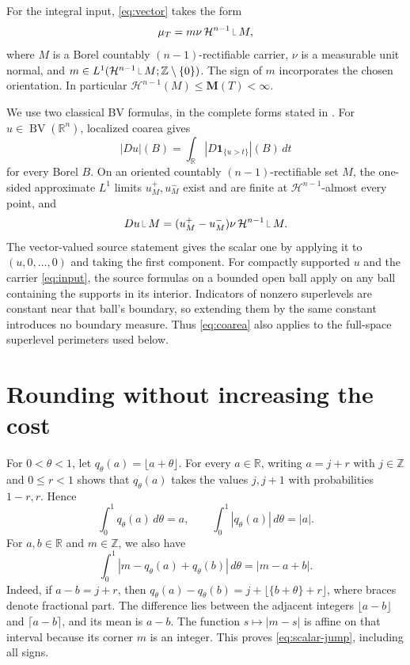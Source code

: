 \documentclass[11pt]{article}
\newcommand{\R}{\mathbb R}
\newcommand{\Z}{\mathbb Z}
\newcommand{\M}{\mathbf M}
\newcommand{\HH}{\mathcal H}
\newcommand{\restr}{\mathbin{\vrule height 1.4ex depth 0pt width .07ex\vrule height .07ex depth 0pt width .65ex}}
\newcommand{\BV}{\operatorname{BV}}
\begin{document}
For the integral input, \eqref{eq:vector} takes the form
\begin{equation}\label{eq:input}
\mu_T=m\nu\,\HH^{n-1}\restr M,
\end{equation}
where $M$ is a Borel countably $(n-1)$-rectifiable carrier, $\nu$ is a
measurable unit normal, and $m\in L^1(\HH^{n-1}\restr M;\Z\setminus\{0\})$.
The sign of $m$ incorporates the chosen orientation.
In particular $\HH^{n-1}(M)\le\M(T)<\infty$.

We use two classical BV formulas, in the complete forms stated in
\cite[Theorems A.9 and A.18]{RT}. For $u\in\BV(\R^n)$, localized coarea gives
\begin{equation}\label{eq:coarea}
|Du|(B)=\int_\R |D\mathbf1_{\{u>t\}}|(B)\,dt
\end{equation}
for every Borel $B$. On an oriented countably $(n-1)$-rectifiable set $M$,
the one-sided approximate $L^1$ limits $u_M^+,u_M^-$ exist and are finite
at $\HH^{n-1}$-almost every point, and
\begin{equation}\label{eq:trace}
Du\restr M=(u_M^+-u_M^-)\nu\,\HH^{n-1}\restr M.
\end{equation}
The vector-valued source statement gives the scalar one by applying it to
$(u,0,\ldots,0)$ and taking the first component. For compactly supported $u$
and the carrier \eqref{eq:input}, the source formulas on a bounded open ball
apply on any ball containing the supports in its interior. Indicators of
nonzero superlevels are constant near that ball's boundary, so extending
them by the same constant introduces no boundary measure. Thus
\eqref{eq:coarea} also applies to the full-space superlevel perimeters used
below.

\section{Rounding without increasing the cost}
For $0<\theta<1$, let $q_\theta(a)=\lfloor a+\theta\rfloor$.
For every $a\in\R$, writing $a=j+r$ with $j\in\Z$ and $0\le r<1$ shows that
$q_\theta(a)$ takes the values $j,j+1$ with probabilities $1-r,r$. Hence
\begin{equation}\label{eq:scalar-volume}
\int_0^1q_\theta(a)\,d\theta=a,\qquad
\int_0^1|q_\theta(a)|\,d\theta=|a|.
\end{equation}
For $a,b\in\R$ and $m\in\Z$, we also have
\begin{equation}\label{eq:scalar-jump}
\int_0^1|m-q_\theta(a)+q_\theta(b)|\,d\theta=|m-a+b|.
\end{equation}
Indeed, if $a-b=j+r$, then
$q_\theta(a)-q_\theta(b)=j+\lfloor\{b+\theta\}+r\rfloor$, where braces
denote fractional part. The difference lies between the adjacent integers
$\lfloor a-b\rfloor$ and $\lceil a-b\rceil$, and its mean is $a-b$.
The function $s\mapsto|m-s|$ is affine on that interval because its corner
$m$ is an integer. This proves \eqref{eq:scalar-jump}, including all signs.
\end{document}

